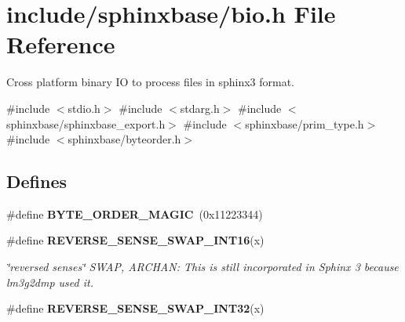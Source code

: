 \section{include/sphinxbase/bio.h \-File \-Reference}
\label{bio_8h}


\-Cross platform binary \-I\-O to process files in sphinx3 format.  


{\ttfamily \#include $<$stdio.\-h$>$}\*
{\ttfamily \#include $<$stdarg.\-h$>$}\*
{\ttfamily \#include $<$sphinxbase/sphinxbase\-\_\-export.\-h$>$}\*
{\ttfamily \#include $<$sphinxbase/prim\-\_\-type.\-h$>$}\*
{\ttfamily \#include $<$sphinxbase/byteorder.\-h$>$}\*
\subsection*{\-Defines}
\begin{DoxyCompactItemize}
\item 
\#define {\bfseries \-B\-Y\-T\-E\-\_\-\-O\-R\-D\-E\-R\-\_\-\-M\-A\-G\-I\-C}~(0x11223344)\label{bio_8h_ac08e1e4728563a03ff6c937bfa8fd845}

\item 
\#define {\bf \-R\-E\-V\-E\-R\-S\-E\-\_\-\-S\-E\-N\-S\-E\-\_\-\-S\-W\-A\-P\-\_\-\-I\-N\-T16}(x)
\begin{DoxyCompactList}\small\item\em \char`\"{}reversed senses\char`\"{} \-S\-W\-A\-P, \-A\-R\-C\-H\-A\-N\-: \-This is still incorporated in \-Sphinx 3 because lm3g2dmp used it. \end{DoxyCompactList}\item 
\#define {\bfseries \-R\-E\-V\-E\-R\-S\-E\-\_\-\-S\-E\-N\-S\-E\-\_\-\-S\-W\-A\-P\-\_\-\-I\-N\-T32}(x)\label{bio_8h_a2c277e579a007b5c46bd762a7d18b2cf}

\end{DoxyCompactItemize}
